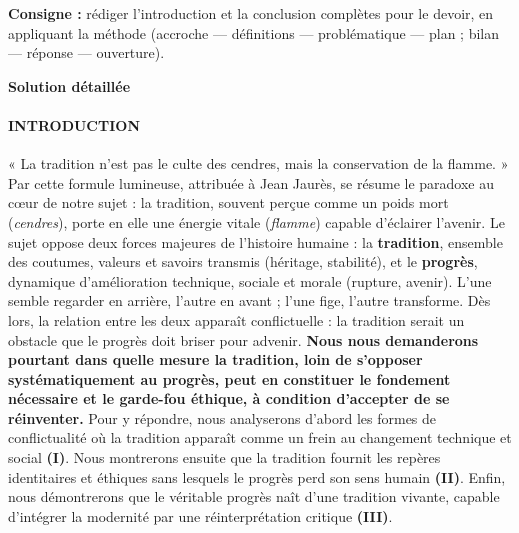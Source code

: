 \documentclass[11pt]{article}
\begin{document}
\begin{exoresolu}
\textbf{Consigne :} rédiger l'introduction et la conclusion complètes pour le devoir, en appliquant la méthode (accroche — définitions — problématique — plan ; bilan — réponse — ouverture).

\tcblower
\textbf{Solution détaillée}

\paragraph{INTRODUCTION}
« La tradition n'est pas le culte des cendres, mais la conservation de la flamme. » Par cette formule lumineuse, attribuée à Jean Jaurès, se résume le paradoxe au cœur de notre sujet : la tradition, souvent perçue comme un poids mort (\emph{cendres}), porte en elle une énergie vitale (\emph{flamme}) capable d'éclairer l'avenir. Le sujet oppose deux forces majeures de l'histoire humaine : la \textbf{tradition}, ensemble des coutumes, valeurs et savoirs transmis (héritage, stabilité), et le \textbf{progrès}, dynamique d'amélioration technique, sociale et morale (rupture, avenir). L'une semble regarder en arrière, l'autre en avant ; l'une fige, l'autre transforme. Dès lors, la relation entre les deux apparaît conflictuelle : la tradition serait un obstacle que le progrès doit briser pour advenir. \textbf{Nous nous demanderons pourtant dans quelle mesure la tradition, loin de s'opposer systématiquement au progrès, peut en constituer le fondement nécessaire et le garde-fou éthique, à condition d'accepter de se réinventer.} Pour y répondre, nous analyserons d'abord les formes de conflictualité où la tradition apparaît comme un frein au changement technique et social \textbf{(I)}. Nous montrerons ensuite que la tradition fournit les repères identitaires et éthiques sans lesquels le progrès perd son sens humain \textbf{(II)}. Enfin, nous démontrerons que le véritable progrès naît d'une tradition vivante, capable d'intégrer la modernité par une réinterprétation critique \textbf{(III)}.


\end{exoresolu}
\end{document}
